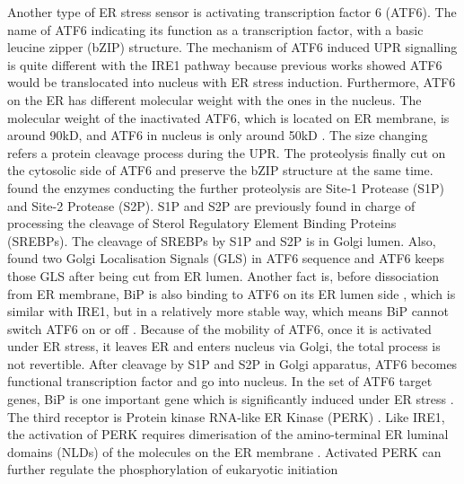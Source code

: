 Another type of ER stress sensor is activating transcription factor 6 (ATF6). The name of ATF6 indicating its function as a transcription factor, with a basic leucine zipper (bZIP) structure. The mechanism of ATF6 induced UPR signalling is quite different with the IRE1 pathway because previous works showed ATF6 would be translocated into nucleus with ER stress induction. Furthermore, ATF6 on the ER has different molecular weight with the ones in the nucleus. The molecular weight of the inactivated ATF6, which is located on ER membrane, is around 90kD, and ATF6 in nucleus is only around 50kD \citep{haze1999mammalian}. The size changing refers a protein cleavage process during the UPR. The proteolysis finally cut on the cytosolic side of ATF6 and preserve the bZIP structure at the same time. \citet{ye2000er} found the enzymes conducting the further proteolysis are Site-1 Protease (S1P) and Site-2 Protease (S2P). S1P and S2P are previously found in charge of processing the cleavage of Sterol Regulatory Element Binding Proteins (SREBPs). The cleavage of SREBPs by S1P and S2P is in Golgi lumen. Also, \citet{shen2002er} found two Golgi Localisation Signals (GLS) in ATF6 sequence and ATF6 keeps those GLS after being cut from ER lumen. Another fact is, before dissociation from ER membrane, BiP is also binding to ATF6 on its ER lumen side , which is similar with IRE1, but in a relatively more stable way, which means BiP cannot switch ATF6 on or off \citep{shen2005stable}. Because of the mobility of ATF6, once it is activated under ER stress, it leaves ER and enters nucleus via Golgi, the total process is not revertible. After cleavage by S1P and S2P in Golgi apparatus, ATF6 becomes functional transcription factor and go into nucleus. In the set of ATF6 target genes, BiP is one important gene which is significantly induced under ER stress \citep{adachi2008atf6}. \\
The third receptor is Protein kinase RNA-like ER Kinase (PERK) \citep{shi1998identification}. Like IRE1, the activation of PERK requires dimerisation of the amino-terminal ER luminal domains (NLDs) of the molecules on the ER membrane \citep{liu2000ligand}. Activated PERK can further regulate the phosphorylation of eukaryotic initiation

